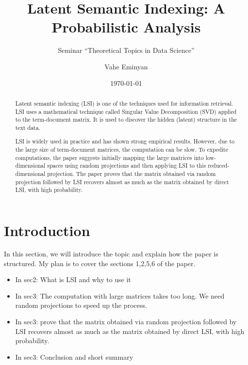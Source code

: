 \documentclass[a4paper,11pt,DIV=15]{scrartcl} %
\theoremstyle{plain}
\theoremstyle{definition}
\begin{document}
\subtitle{Seminar ``Theoretical Topics in Data Science''}
\date{\today}
\publishers{RWTH Aachen University}	%

\title{Latent Semantic Indexing: A Probabilistic Analysis}

\author{Vahe Eminyan}

\maketitle


\begin{abstract}
Latent semantic indexing (LSI) is one of the techniques used for information retrieval.
LSI uses a mathematical technique called Singular Value Decomposition (SVD) applied to the term-document matrix. It is used to discover the hidden (latent) structure in the text data.

LSI is widely used in practice and has shown strong empirical results. However, due to the large size of term-document matrices, the computation can be slow. 
To expedite computations, the paper suggests initially mapping the large matrices into low-dimensional spaces using random projections and then applying LSI to this reduced-dimensional projection.
The paper proves that the matrix obtained via random projection followed by LSI recovers almost as
much as the matrix obtained by direct LSI, with high probability.



\end{abstract}

\thispagestyle{empty}

\clearpage


\section{Introduction}
In this section, we will introduce the topic and explain how the paper is structured.
My plan is to cover the sections 1,2,5,6 of the paper.
\begin{itemize}
    \item In sec2: What is LSI and why to use it
    \item In sec3: The computation with large matrices takes too long. We need random projections to speed up the process.
    \item In sec3: prove that the matrix obtained via random projection followed by LSI recovers almost as
much as the matrix obtained by direct LSI, with high probability.
    \item In sec3: Conclusion and short summary
\end{itemize}
\end{document}
